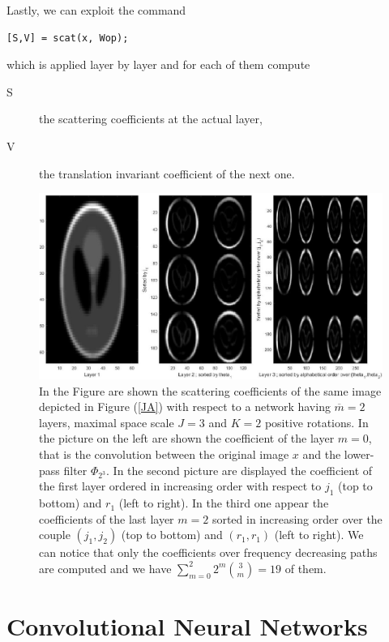 \documentclass[12pt,a4paper]{article}
\theoremstyle{remark}
\begin{document}
Lastly, we can exploit the command
\begin{lstlisting}
[S,V] = scat(x, Wop);
\end{lstlisting}
which is applied layer by layer and for each of them compute
\begin{description}
	\item[S]  the scattering coefficients at the actual layer,
	\item[V] the translation invariant coefficient of the next one.
\end{description} 

\begin{figure}[ht]
	\centering
	\includegraphics[width=1\linewidth, height=0.35\textheight]{img/J3L2M2O1_2}
	\caption{In the Figure are shown the scattering coefficients of the same image depicted in Figure (\ref{JA}) with respect to a network having $\overline{m} = 2$ layers, maximal space scale $J=3$ and $K=2$ positive rotations.
	In the picture on the left are shown the coefficient of the  layer $m=0$, that is the convolution between the original image $x$ and the lower-pass filter $\Phi_{2^3}$.
	In the second picture are displayed the coefficient of the first layer ordered in increasing order with respect to $j_1$ (top to bottom) and $r_1$ (left to right). 
	In the third one appear the coefficients of the last layer $m=2$ sorted in increasing order over the couple $(j_1, j_2)$ (top to bottom) and $(r_1, r_1)$ (left to right). We can notice that only the coefficients over frequency decreasing paths are computed and we have $ {\sum_{m=0}^{2} 2^m {{3}\choose{m}}} = 19$ of them.}
	\label{fig:j3l2m2o1}
\end{figure}

\section{Convolutional Neural Networks} %
\end{document}
